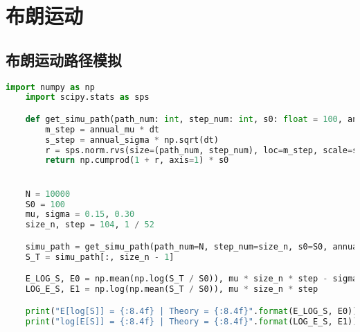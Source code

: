 \section{布朗运动}
\subsection{布朗运动路径模拟}\label{sub_sec_code_block_bm_pah}
\begin{lstlisting}[language=Python]
    import numpy as np
    import scipy.stats as sps

    def get_simu_path(path_num: int, step_num: int, s0: float = 100, annual_mu: float = 0, annual_sigma: float = 1, dt: float = 0.01):
        m_step = annual_mu * dt
        s_step = annual_sigma * np.sqrt(dt)
        r = sps.norm.rvs(size=(path_num, step_num), loc=m_step, scale=s_step)
        return np.cumprod(1 + r, axis=1) * s0


    N = 10000
    S0 = 100
    mu, sigma = 0.15, 0.30
    size_n, step = 104, 1 / 52

    simu_path = get_simu_path(path_num=N, step_num=size_n, s0=S0, annual_mu=mu, annual_sigma=sigma, dt=step)
    S_T = simu_path[:, size_n - 1]

    E_LOG_S, E0 = np.mean(np.log(S_T / S0)), mu * size_n * step - sigma ** 2 / 2 * size_n * step
    LOG_E_S, E1 = np.log(np.mean(S_T / S0)), mu * size_n * step

    print("E[log[S]] = {:8.4f} | Theory = {:8.4f}".format(E_LOG_S, E0))
    print("log[E[S]] = {:8.4f} | Theory = {:8.4f}".format(LOG_E_S, E1))

\end{lstlisting}